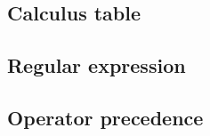 \documentclass[titlepage,a4paper,10pt]{article}
\begin{document}
\begin{multicols}{2}
\begin{spacing}{0.6}
{			\subsection{Calculus table}
				
				
			\subsection{Regular expression}
				
			\subsection{Operator precedence}
				
		}
		\end{spacing}
		\endgroup
	\end{multicols}
\end{document}
